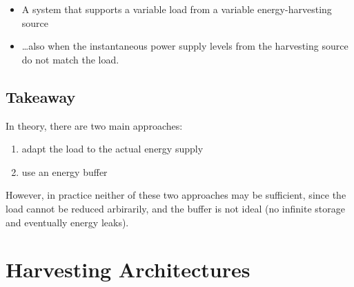 \begin{definition}

   \begin{itemize}
      \item A system that supports a variable load from a variable energy-harvesting source
      \item \dots also when the instantaneous power supply levels from the harvesting source do not match the load.
   \end{itemize}
\end{definition}

\subsection{Takeaway}
In theory, there are two main approaches:
\begin{enumerate}
   \item adapt the load to the actual energy supply
   \item use an energy buffer
\end{enumerate}

However, in practice neither of these two approaches may be sufficient, since the load cannot be reduced arbirarily, and the buffer is not ideal (no infinite storage and eventually energy leaks).
\newpage
\section{Harvesting Architectures}
